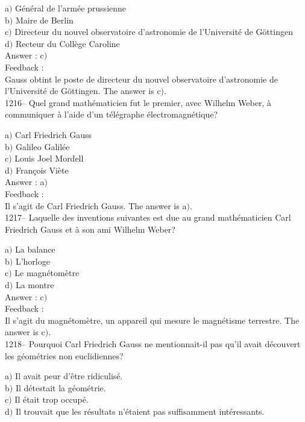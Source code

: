 \documentclass[letterpaper, 12pt]{article}
\begin{document}
a$)$ G\'en\'eral de l'arm\'ee prussienne \\
b$)$ Maire de Berlin \\
c$)$ Directeur du nouvel observatoire d'astronomie de l'Universit\'e de
G\"ottingen \\
d$)$ Recteur du Coll\`ege Caroline\\

Answer : c$)$\\

Feedback : \\
Gauss obtint le poste de directeur du nouvel observatoire
d'astronomie de l'Universit\'e de G\"ottingen.
The answer is c$)$.\\

1216-- Quel grand math\'ematicien fut le premier, avec Wilhelm
Weber, \`a communiquer \`a l'aide d'un t\'el\'egraphe
\'electromagn\'etique?

a$)$ Carl Friedrich Gauss \\
b$)$ Galileo Galil\'ee \\
c$)$ Louis Joel Mordell \\
d$)$ Fran\c cois Vi\`ete\\

Answer : a$)$\\

Feedback : \\
Il s'agit de Carl Friedrich Gauss.
The answer is a$)$.\\

1217-- Laquelle des inventions suivantes est due au grand
math\'ematicien Carl Friedrich Gauss et \`a son ami Wilhelm Weber?

a$)$ La balance \\
b$)$ L'horloge \\
c$)$ Le magn\'etom\`etre \\
d$)$ La montre\\

Answer : c$)$\\

Feedback : \\
Il s'agit du magn\'etom\`etre, un appareil qui mesure le
magn\'etisme terrestre.
The answer is c$)$.\\

1218-- Pourquoi Carl Friedrich Gauss ne mentionnait-il pas qu'il
avait d\'ecouvert les g\'eom\'etries non euclidiennes?

a$)$ Il avait peur d'\^etre ridiculis\'e. \\
b$)$ Il d\'etestait la g\'eom\'etrie. \\
c$)$ Il \'etait trop occup\'e. \\
d$)$ Il trouvait que les r\'esultats n'\'etaient pas suffisamment
int\'eressants.\\
\end{document}
